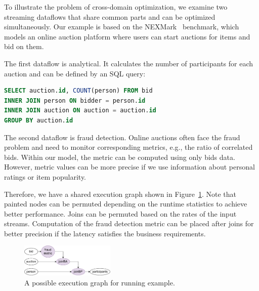 To illustrate the problem of cross-domain optimization, we examine two streaming dataflows that share common parts and can be optimized simultaneously. Our example is based on the NEXMark~\cite{tucker2008nexmark} benchmark, which models an online auction platform where users can start auctions for items and bid on them.

The first dataflow is analytical. It calculates the number of participants for each auction and can be defined by an SQL query:
\begin{lstlisting}[language=SQL]
SELECT auction.id, COUNT(person) FROM bid
INNER JOIN person ON bidder = person.id
INNER JOIN auction ON auction = auction.id
GROUP BY auction.id
\end{lstlisting}

The second dataflow is fraud detection. Online auctions often face the fraud problem and need to monitor corresponding metrics, e.g., the ratio of correlated bids. Within our model, the metric can be computed using only bids data.
However, metric values can be more precise if we use information about personal ratings or item popularity.

Therefore, we have a shared execution graph shown in Figure~\ref{fig:example}. Note that painted nodes can be permuted depending on the runtime statistics to achieve better performance. Joins can be permuted based on the rates of the input streams. Computation of the fraud detection metric can be placed after joins for better precision if the latency satisfies the business requirements.

\begin{figure}[h!]
    \includegraphics[width=0.4\textwidth]{images/example.pdf}
    \caption{A possible execution graph for running example.}
    \label{fig:example}
\end{figure}
